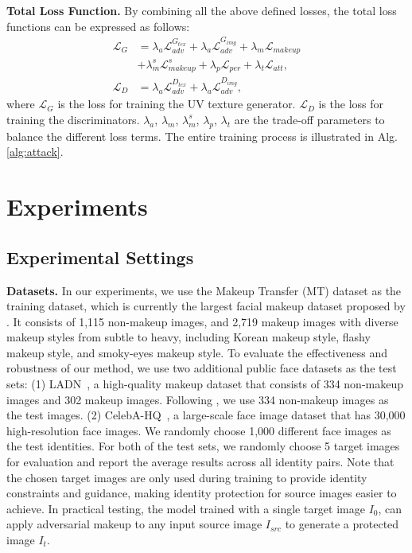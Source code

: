\documentclass[10pt,journal,compsoc]{IEEEtran}
\begin{document}
{\bf Total Loss Function.}
By combining all the above defined losses, the total loss functions can be expressed as follows:
\begin{equation}
  \begin{aligned}
  \mathcal{L}_{G} &= \lambda_{a}\mathcal{L}_{adv}^{G_{tex}} + \lambda_{a}\mathcal{L}_{adv}^{G_{img}} + \lambda_{m}\mathcal{L}_{makeup} \\
&+ \lambda^s_{m}\mathcal{L}^s_{makeup} + \lambda_{p}\mathcal{L}_{per} + \lambda_{t}\mathcal{L}_{att}   \text{,}\\
  \mathcal{L}_{D} &= \lambda_{a}\mathcal{L}_{adv}^{D_{tex}} + \lambda_{a}\mathcal{L}_{adv}^{D_{img}} \text{,}
  \end{aligned}
  \label{con:totalloss}
\end{equation}
where $\mathcal{L}_{G}$ is the loss for training the UV texture generator. $\mathcal{L}_{D}$ is the loss for training the discriminators. 
$\lambda_a$, $\lambda_m$, $\lambda^s_m$, $\lambda_p$, $\lambda_t$ are the trade-off parameters to balance the different loss terms. The entire training process is illustrated in Alg.\ref{alg:attack}.

\section{Experiments}
\label{sec:exp}
\subsection{Experimental Settings}
{\bf Datasets.}
In our experiments, we use the Makeup Transfer (MT) dataset as the training dataset, which is currently the largest facial makeup dataset proposed by \cite{li2018beautygan}. 
%
It consists of 1,115 non-makeup images, and 2,719 makeup images with diverse makeup styles from subtle to heavy, including Korean makeup style, flashy makeup style, and smoky-eyes makeup style. 
%
To evaluate the effectiveness and robustness of our method, we use two additional public face datasets as the test sets: 
%
(1) LADN~\cite{gu2019ladn}, a high-quality makeup dataset that consists of 334 non-makeup images and 302 makeup images. Following \cite{hu2022protecting}, we use 334 non-makeup images as the test images. 
%
(2) CelebA-HQ~\cite{karras2018progressive}, a large-scale face image dataset that has 30,000 high-resolution face images. We randomly choose 1,000 different face images as the test identities. 
%
For both of the test sets, we randomly choose 5 target images for evaluation and report the average results across all identity pairs. Note that the chosen target images are only used during training to provide identity constraints and guidance, making identity protection for source images easier to achieve. In practical testing, the model trained with a single target image $I_0$, can apply adversarial makeup to any input source image $I_{src}$ to generate a protected image $I_t$.
\end{document}
